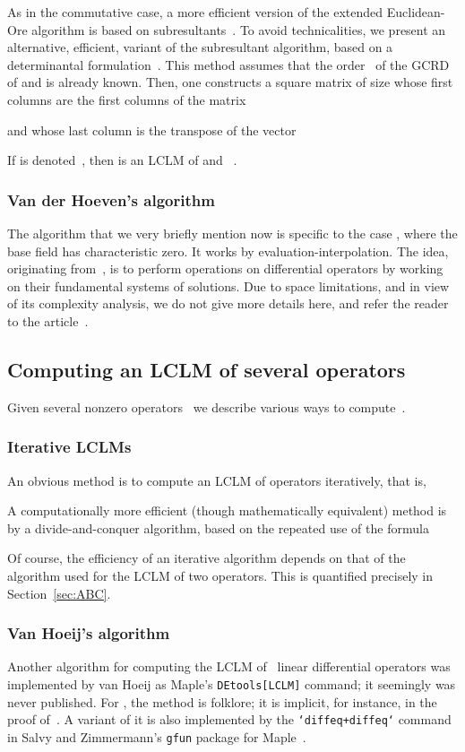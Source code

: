 \documentclass{sig-alt-full}
\begin{document}
\medskip {}
As in the commutative case, a more efficient version of the extended Euclidean-Ore algorithm is based on subresultants~\cite[\S5]{Li98}.
To avoid technicalities, we present an alternative, efficient, variant of the subresultant algorithm, 
based on a determinantal formulation~\cite[Proposition~6.1]{Li98}. This method assumes that the order~ of the GCRD of  and  is already known. Then, one constructs a square matrix  of size  whose first  columns are the first  columns of the matrix 

and whose last column is the transpose of the vector


\noindent If  is denoted~, then   is an LCLM of  and ~.

\subsubsection{Van der Hoeven's algorithm}
The algorithm that we very briefly mention now is specific to the case , where the base field  has characteristic zero. It works by evaluation-interpolation. The idea, originating
from~\cite{Bostan03}, is to perform operations on differential operators by
working on their fundamental systems of solutions. Due to space limitations, and in view of its complexity analysis,
we do not give more details here, and refer the reader to the
article~\cite{VdHoeven11}.

\subsection{Computing an LCLM of several operators} \label{SUBSECT:comps}
Given several nonzero operators~ 
we describe various ways to compute~.

\subsubsection{Iterative LCLMs}
An obvious method is to compute an LCLM of  operators iteratively, that is,
	

A computationally more efficient (though mathematically equivalent) method is by a divide-and-conquer algorithm, based on the repeated use of the formula


Of course, the efficiency of an iterative algorithm depends on that of the algorithm used for the LCLM of two operators. This is quantified precisely in Section~\ref{sec:ABC}.

\subsubsection{Van Hoeij's algorithm}
Another algorithm for computing the LCLM of ~linear differential operators was implemented by van Hoeij as Maple's \verb+DEtools[LCLM]+ command; it seemingly was never published.
For , the method is folklore; it is implicit, for instance, in the proof of~\cite[Theorem~2.3]{Stanley80}. A variant of it is also implemented  by the \texttt{`diffeq+diffeq`} command in Salvy and Zimmermann's \verb+gfun+ package for Maple~\cite{SaZi94}.
\end{document}
